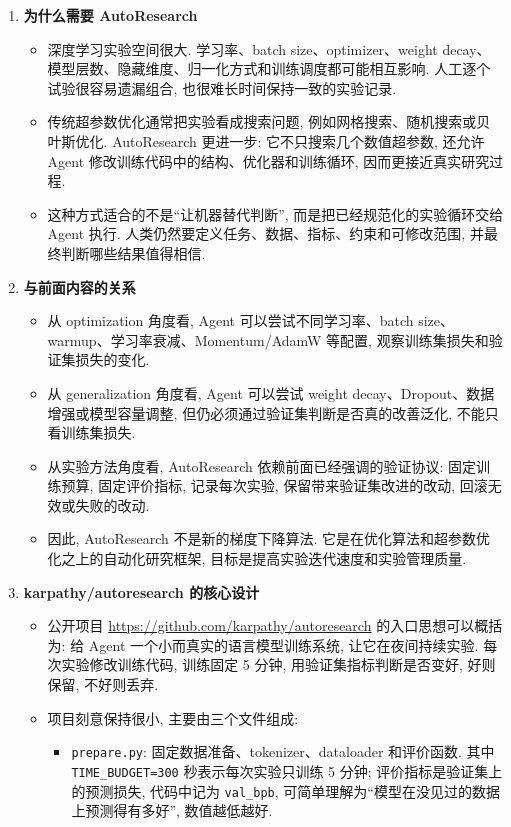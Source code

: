 \documentclass{../nndlcourse}
\begin{document}
\begin{enumerate}
  \item \textbf{为什么需要 AutoResearch}
    \begin{itemize}
      \item 深度学习实验空间很大. 学习率、batch size、optimizer、weight decay、模型层数、隐藏维度、归一化方式和训练调度都可能相互影响. 人工逐个试验很容易遗漏组合, 也很难长时间保持一致的实验记录.
      \item 传统超参数优化通常把实验看成搜索问题, 例如网格搜索、随机搜索或贝叶斯优化. AutoResearch 更进一步: 它不只搜索几个数值超参数, 还允许 Agent 修改训练代码中的结构、优化器和训练循环, 因而更接近真实研究过程.
      \item 这种方式适合的不是“让机器替代判断”, 而是把已经规范化的实验循环交给 Agent 执行. 人类仍然要定义任务、数据、指标、约束和可修改范围, 并最终判断哪些结果值得相信.
    \end{itemize}
  \item \textbf{与前面内容的关系}
    \begin{itemize}
      \item 从 optimization 角度看, Agent 可以尝试不同学习率、batch size、warmup、学习率衰减、Momentum/AdamW 等配置, 观察训练集损失和验证集损失的变化.
      \item 从 generalization 角度看, Agent 可以尝试 weight decay、Dropout、数据增强或模型容量调整, 但仍必须通过验证集判断是否真的改善泛化, 不能只看训练集损失.
      \item 从实验方法角度看, AutoResearch 依赖前面已经强调的验证协议: 固定训练预算, 固定评价指标, 记录每次实验, 保留带来验证集改进的改动, 回滚无效或失败的改动.
      \item 因此, AutoResearch 不是新的梯度下降算法. 它是在优化算法和超参数优化之上的自动化研究框架, 目标是提高实验迭代速度和实验管理质量.
    \end{itemize}
  \item \textbf{karpathy/autoresearch 的核心设计}
    \begin{itemize}
      \item 公开项目 \url{https://github.com/karpathy/autoresearch} 的入口思想可以概括为: 给 Agent 一个小而真实的语言模型训练系统, 让它在夜间持续实验. 每次实验修改训练代码, 训练固定 5 分钟, 用验证集指标判断是否变好, 好则保留, 不好则丢弃.
      \item 项目刻意保持很小, 主要由三个文件组成:
        \begin{itemize}
          \item \texttt{prepare.py}: 固定数据准备、tokenizer、dataloader 和评价函数. 其中 \texttt{TIME\_BUDGET=300} 秒表示每次实验只训练 5 分钟; 评价指标是验证集上的预测损失, 代码中记为 \texttt{val\_bpb}, 可简单理解为“模型在没见过的数据上预测得有多好”, 数值越低越好.

\end{itemize}
\end{itemize}
\end{enumerate}
\end{document}
